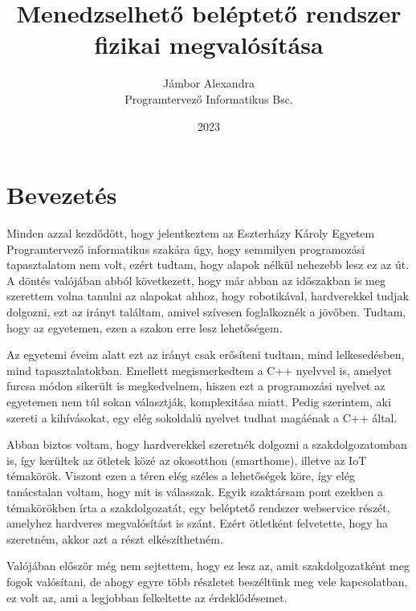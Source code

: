 \documentclass[
]{thesis-ekf}
\theoremstyle{definition}
\theoremstyle{remark}
\begin{document}
\title{Menedzselhető beléptető rendszer fizikai megvalósítása}
\author{Jámbor Alexandra\\Programtervező Informatikus Bsc.}
\date{2023}
\maketitle
\tableofcontents



\chapter*{Bevezetés}
Minden azzal kezdődött, hogy jelentkeztem az Eszterházy Károly Egyetem Programtervező informatikus szakára úgy, hogy semmilyen programozási tapasztalatom nem volt, ezért tudtam, hogy alapok nélkül nehezebb lesz ez az út. A döntés valójában abból következett, hogy már abban az időszakban is meg szerettem volna tanulni az alapokat ahhoz, hogy robotikával, hardverekkel tudjak dolgozni, ezt az irányt találtam, amivel szívesen foglalkoznék a jövőben. Tudtam, hogy az egyetemen, ezen a szakon erre lesz lehetőségem.

Az egyetemi éveim alatt ezt az irányt csak erősíteni tudtam, mind lelkesedésben, mind tapasztalatokban. Emellett megismerkedtem a C++ nyelvvel is, amelyet furcsa módon sikerült is megkedvelnem, hiszen ezt a programozási nyelvet az egyetemen nem túl sokan választják, komplexitása miatt. Pedig szerintem, aki szereti a kihívásokat, egy elég sokoldalú nyelvet tudhat magáénak a C++ által.

Abban biztos voltam, hogy hardverekkel szeretnék dolgozni a szakdolgozatomban is, így kerültek az ötletek közé az okosotthon (smarthome), illetve az IoT témakörök. Viszont ezen a téren elég széles a lehetőségek köre, így elég tanácstalan voltam, hogy mit is válasszak. Egyik szaktársam pont ezekben a témakörökben írta a szakdolgozatát, egy beléptető rendszer webservice részét, amelyhez hardveres megvalósítást is szánt. Ezért ötletként felvetette, hogy ha szeretném, akkor azt a részt elkészíthetném.

Valójában először még nem sejtettem, hogy ez lesz az, amit szakdolgozatként meg fogok valósítani, de ahogy egyre több részletet beszéltünk meg vele kapcsolatban, ez volt az, ami a legjobban felkeltette az érdeklődésemet.
\end{document}
